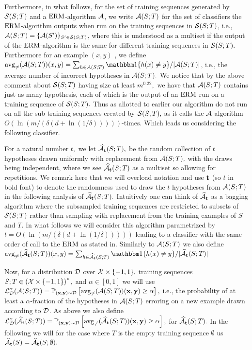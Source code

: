 Furthermore, in what follows, for the set of training sequences generated by $ \mathcal{S}(S;T) $ and a $ \mathrm{ERM} $-algorithm $ \mathcal{A} $, we  write $ \mathcal{A}(S;T) $ for the set of classifiers the $ \mathrm{ERM} $-algorithm outputs when run on the training sequences in $ \mathcal{S}(S;T) $, i.e., $ \mathcal{A}(S;T)=\{ \mathcal{A}(S') \}_{S'\in\mathcal{S}(S;T)}  $, where this is understood as a multiset if the output of the $ \mathrm{ERM} $-algorithm is the same for different training sequences in $ \mathcal{S}(S;T).$ 
Furthermore for an example $ (x,y) $ , we define $ \avg(\erm(S;T))(x,y)=\sum_{h\in \erm(S;T)}\ind\{ h(x)\not=y \}/|\erm(S;T)| $, i.e., the average number of incorrect hypotheses in $ \mathcal{A}(S;T) .$  
We notice that by the above comment about $ \mathcal{S}(S;T) $ having size at least $ m^{0.22},$ we have that $ \mathcal{A}(S;T) $ contains just as many hypothesis, each of which is the output of an $ \mathrm{ERM} $ run on a training sequence of $ \mathcal{S}(S;T).$ Thus as allotted to earlier our algorithm do not run on all the sub training sequences created by $ \mathcal{S}(S;T),$ as it calls the $ \mathcal{A} $ algorithm $ O(\ln{\left(m/(\delta(d+\ln{\left(1/\delta \right)})) \right)}) $-times. Which leads us considering the following classifier.

For a natural number $ t,$ we let $ \widehat{\mathcal{A}}_{\mathbf{t}}(S;T),$ be the random collection of $ t $ hypotheses drawn uniformly with replacement from $ \mathcal{A}(S;T),$ with the draws being independent, where we see $ \widehat{\mathcal{A}}_{\mathbf{t}}(S;T) $ as a multiset so allowing for repetitions. 
We remark here that we will overload notation and use $ \mathbf{t} $ (so $ t $ in bold font) to denote the randomness used to draw the $ t $ hypotheses from $ \mathcal{A}(S;T)$ in the following analysis of $ \widehat{\mathcal{A}}_{\mathbf{t}}(S;T).$ 
Intuitively one can think of $ \widehat{\mathcal{A}}_{\mathbf{t}} $ as a bagging algorithm where the subsampled training sequences are restricted to subsets of $ \mathcal{S}(S;T) $ rather than sampling with replacement from the training examples of $ S $ and $ T.$ In what follows we will consider this algorithm parametrized by $ t=O(\ln{\left(m/(\delta(d+\ln{\left(1/\delta \right)})) \right)}) $ leading to a classifier with the same order of call to the $ \mathrm{ERM} $ as stated in. Similarly to $ \mathcal{A}(S;T) $ we also define $ \avg(\widehat{\erm}_{\rt}(S;T))(x,y)=\sum_{h\in \widehat{\erm}_{\rt}(S;T)}\ind\{ h(x)\not=y \}/|\widehat{\erm}_{\rt}(S;T)| $

Now, for a distribution $ \mathcal{D} $ over $ \mathcal{X}\times \{ -1,1\},$ training sequences $ S;T\in \left(\mathcal{X}\times\{  -1,1\} \right)^{*},$ and $ \alpha\in[0,1] $  we will use $ \operatorname{\mathcal{L}}_{\mathcal{D}}^{\alpha}(\mathcal{A}(S;T))=\operatorname*{\mathbb{P}}_{(\mathbf{x},\mathbf{y})\sim \mathcal{D}}\left[\operatorname{\mathrm{avg}_{\not=}}(\mathcal{A}(S;T))(\mathbf{x},\mathbf{y}) \geq \alpha\right],$ i.e., the probability of at least a $ \alpha $-fraction of the hypotheses in $ \mathcal{A}(S;T) $ erroring on a new example drawn according to $ \mathcal{D} $. As above we also define $ \operatorname{\mathcal{L}}_{\mathcal{D}}^{\alpha}(\widehat{\mathcal{A}}_{\mathbf{t}}(S;T))=\operatorname*{\mathbb{P}}_{(\mathbf{x},\mathbf{y})\sim \mathcal{D}}\left[\operatorname{\mathrm{avg}_{\not=}}(\widehat{\mathcal{A}}_{\mathbf{t}}(S;T))(\mathbf{x},\mathbf{y}) \geq \alpha\right],$ for $ \widehat{\mathcal{A}}_{\mathbf{t}}(S;T). $ In the following we will for the case where $ T $ is the empty training sequence $ \emptyset $   us $ \widehat{\mathcal{A}}_{\mathbf{t}}(S)=\widehat{\mathcal{A}}_{\mathbf{t}}(S;\emptyset). $   
